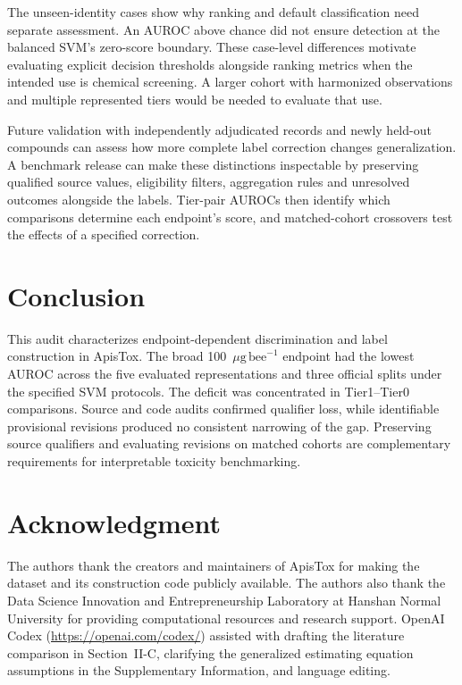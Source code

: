 \documentclass{ieeeaccess}
\newcommand{\ugbee}{\ensuremath{\mu\mathrm{g\,bee}^{-1}}\xspace}
\begin{document}
The unseen-identity cases show why ranking and default classification need separate assessment. An AUROC above chance did not ensure detection at the balanced SVM's zero-score boundary. These case-level differences motivate evaluating explicit decision thresholds alongside ranking metrics when the intended use is chemical screening. A larger cohort with harmonized observations and multiple represented tiers would be needed to evaluate that use.

Future validation with independently adjudicated records and newly held-out compounds can assess how more complete label correction changes generalization. A benchmark release can make these distinctions inspectable by preserving qualified source values, eligibility filters, aggregation rules and unresolved outcomes alongside the labels. Tier-pair AUROCs then identify which comparisons determine each endpoint's score, and matched-cohort crossovers test the effects of a specified correction.

\section{Conclusion}
This audit characterizes endpoint-dependent discrimination and label construction in ApisTox. The broad 100~\ugbee endpoint had the lowest AUROC across the five evaluated representations and three official splits under the specified SVM protocols. The deficit was concentrated in Tier1--Tier0 comparisons. Source and code audits confirmed qualifier loss, while identifiable provisional revisions produced no consistent narrowing of the gap. Preserving source qualifiers and evaluating revisions on matched cohorts are complementary requirements for interpretable toxicity benchmarking.

\section*{Acknowledgment}
The authors thank the creators and maintainers of ApisTox for making the dataset and its construction code publicly available. The authors also thank the Data Science Innovation and Entrepreneurship Laboratory at Hanshan Normal University for providing computational resources and research support.
OpenAI Codex (\url{https://openai.com/codex/}) assisted with drafting the literature comparison in Section~II-C, clarifying the generalized estimating equation assumptions in the Supplementary Information, and language editing.
\end{document}
